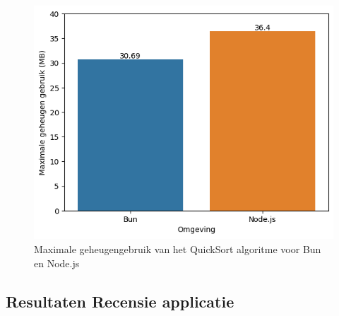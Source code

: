 \begin{figure}[H]
  \centering
  \includegraphics{graphics/RAMScript.png}
  \caption[Geheugengebruik QuickSort algoritme]{\label{fig:RAMscript}Maximale geheugengebruik van het QuickSort algoritme voor Bun en Node.js}
\end{figure}

\subsection{Resultaten Recensie applicatie}
